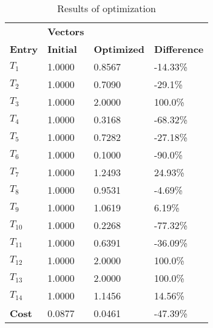 \begin{table}[H]
\centering
\begin{tabular}{llll}
\textbf{}      & \cellcolor[HTML]{EFEFEF}\textbf{Vectors} & \textbf{} & \textbf{}         \\
\rowcolor[HTML]{EFEFEF} 
\textbf{Entry} & \textbf{Initial} & \textbf{Optimized} & \textbf{Difference} \\
$T_1$ & 1.0000 & 0.8567 & -14.33\% \\ 
$T_2$ & 1.0000 & 0.7090 & -29.1\% \\ 
$T_3$ & 1.0000 & 2.0000 & 100.0\% \\ 
$T_4$ & 1.0000 & 0.3168 & -68.32\% \\ 
$T_5$ & 1.0000 & 0.7282 & -27.18\% \\ 
$T_6$ & 1.0000 & 0.1000 & -90.0\% \\ 
$T_7$ & 1.0000 & 1.2493 & 24.93\% \\ 
$T_8$ & 1.0000 & 0.9531 & -4.69\% \\ 
$T_9$ & 1.0000 & 1.0619 & 6.19\% \\ 
$T_10$ & 1.0000 & 0.2268 & -77.32\% \\ 
$T_11$ & 1.0000 & 0.6391 & -36.09\% \\ 
$T_12$ & 1.0000 & 2.0000 & 100.0\% \\ 
$T_13$ & 1.0000 & 2.0000 & 100.0\% \\ 
$T_14$ & 1.0000 & 1.1456 & 14.56\% \\ 
\rowcolor[HTML]{EFEFEF} 
\textbf{Cost}  & 0.0877 & 0.0461 & -47.39\% \\ 
\end{tabular}
\caption{Results of optimization}
\label{tab:OptimizationAnalysis}
\end{table}